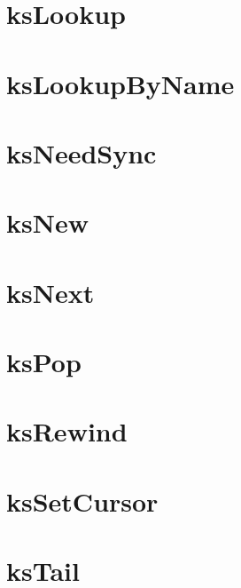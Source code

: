 \let\mypdfximage\pdfximage\def\pdfximage{\immediate\mypdfximage}\documentclass[twoside]{book}
\newcommand{\+}{\discretionary{\mbox{\scriptsize$\hookleftarrow$}}{}{}}
\begin{document}
\chapter{ks\+Lookup}
\label{doc_api_review_core_ksLookup_md}

\chapter{ks\+Lookup\+By\+Name}
\label{doc_api_review_core_ksLookupByName_md}

\chapter{ks\+Need\+Sync}
\label{doc_api_review_core_ksNeedSync_md}

\chapter{ks\+New}
\label{doc_api_review_core_ksNew_md}

\chapter{ks\+Next}
\label{doc_api_review_core_ksNext_md}

\chapter{ks\+Pop}
\label{doc_api_review_core_ksPop_md}

\chapter{ks\+Rewind}
\label{doc_api_review_core_ksRewind_md}

\chapter{ks\+Set\+Cursor}
\label{doc_api_review_core_ksSetCursor_md}

\chapter{ks\+Tail}
\label{doc_api_review_core_ksTail_md}

\end{document}
